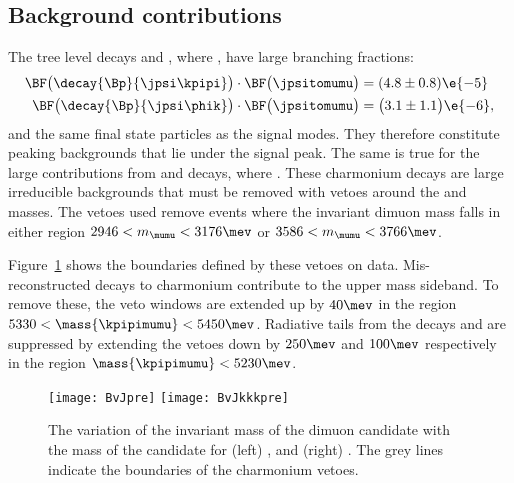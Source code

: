 \subsection{Background contributions}
The tree level decays \decay{\Bp}{\jpsi\kpipi} and \decay{\Bp}{\jpsi\phik}, where
\decay{\jpsi}{\mumu}, have large branching fractions:
\begin{align}
  \BF\big(\decay{\Bp}{\jpsi\kpipi}\big)
  \cdot \BF\big(\jpsitomumu\big)
  &= (4.8 \pm 0.8)\e{-5} \\
  \BF\big(\decay{\Bp}{\jpsi\phik}\big)
  \cdot \BF\big(\jpsitomumu\big)
  &= \big(3.1 \pm 1.1\big)\e{-6},
\end{align}
and the same final state particles as the signal modes.
They therefore constitute peaking backgrounds that lie under the signal peak.
The same is true for the large contributions from \decay{\Bp}{\psitwos\kpipi} and
\decay{\Bp}{\psitwos\phik} decays, where \decay{\psitwos}{\mumu}.
These charmonium decays are large irreducible backgrounds that must be
removed with vetoes around the \jpsi and \psitwos masses.
The vetoes used remove events where the invariant dimuon mass falls in either region
$2946<m_{\mumu}<3176\mev$ or $3586<m_{\mumu}<3766\mev$.

Figure~\ref{fig:hhh:charmvetoes} shows the boundaries defined by these vetoes on data.
Mis-reconstructed decays to charmonium contribute to the upper mass sideband.
To remove these, the veto windows are extended up by $40\mev$ in the region
$5330<\mass{\kpipimumu}<5450\mev$.
Radiative tails from the decays \decay{\jpsi}{\mumu\gamma} and \decay{\psitwos}{\mumu\gamma} are
suppressed by extending the vetoes down by $250\mev$ and $100\mev$ respectively in the region
$\mass{\kpipimumu}<5230\mev$.


\begin{figure}
  \begin{center}
    \texttt{[image: BvJpre]}
    \texttt{[image: BvJkkkpre]}
    \caption[Charmonium vetoes is in \btokpipimumu and \btophikmumu]
    {
      The variation of the invariant mass of the dimuon candidate with the mass of the \Bp
      candidate for
      (left) \btokpipimumu, and
      (right) \btophikmumu.
      The grey lines indicate the boundaries of the charmonium vetoes.
    }
    \label{fig:hhh:charmvetoes}
  \end{center}
\end{figure}

